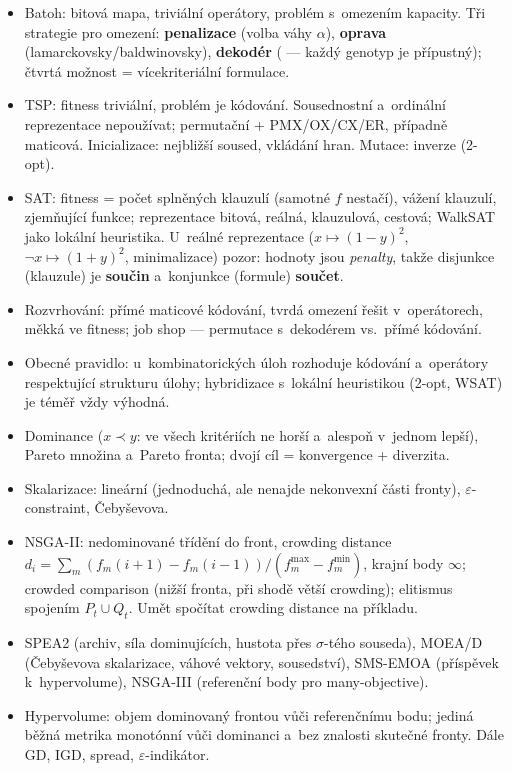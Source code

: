 \documentclass[11pt,a4paper]{article}
\theoremstyle{definition}
\begin{document}
\begin{itemize}
  DeepNEAT a~CoDeepNEAT (moduly + blueprinty); ES pro deep RL.
\item Batoh: bitová mapa, triviální operátory, problém s~omezením kapacity.
  Tři strategie pro omezení: \textbf{penalizace} (volba váhy $\alpha$),
  \textbf{oprava} (lamarckovsky/baldwinovsky), \textbf{dekodér}
  ( --- každý genotyp je přípustný);
  čtvrtá možnost = vícekriteriální formulace.
\item TSP: fitness triviální, problém je kódování. Sousednostní a~ordinální
  reprezentace nepoužívat; permutační + PMX/OX/CX/ER, případně maticová.
  Inicializace: nejbližší soused, vkládání hran. Mutace: inverze (2-opt).
\item SAT: fitness = počet splněných klauzulí (samotné $f$ nestačí),
  vážení klauzulí, zjemňující funkce; reprezentace bitová, reálná,
  klauzulová, cestová; WalkSAT jako lokální heuristika.
  U~reálné reprezentace ($x \mapsto (1-y)^2$, $\neg x \mapsto (1+y)^2$,
  minimalizace) pozor: hodnoty jsou \emph{penalty}, takže disjunkce
  (klauzule) je \textbf{součin} a~konjunkce (formule) \textbf{součet}.
\item Rozvrhování: přímé maticové kódování, tvrdá omezení řešit v~operátorech,
  měkká ve fitness; job shop --- permutace s~dekodérem vs.\ přímé kódování.
\item Obecné pravidlo: u~kombinatorických úloh rozhoduje kódování a~operátory
  respektující strukturu úlohy; hybridizace s~lokální heuristikou (2-opt,
  WSAT) je téměř vždy výhodná.
\item Dominance ($x \prec y$: ve všech kritériích ne horší a~alespoň v~jednom
  lepší), Pareto množina a~Pareto fronta; dvojí cíl = konvergence + diverzita.
\item Skalarizace: lineární (jednoduchá, ale nenajde nekonvexní části fronty),
  $\varepsilon$-constraint, Čebyševova.
\item NSGA-II: nedominované třídění do front, crowding distance
  $d_i = \sum_m (f_m(i+1)-f_m(i-1))/(f_m^{\max}-f_m^{\min})$, krajní body
  $\infty$; crowded comparison (nižší fronta, při shodě větší crowding);
  elitismus spojením $P_t \cup Q_t$. Umět spočítat crowding distance na
  příkladu.
\item SPEA2 (archiv, síla dominujících, hustota přes $\sigma$-tého souseda),
  MOEA/D (Čebyševova skalarizace, váhové vektory, sousedství),
  SMS-EMOA (příspěvek k~hypervolume), NSGA-III (referenční body pro
  many-objective).
\item Hypervolume: objem dominovaný frontou vůči referenčnímu bodu; jediná
  běžná metrika monotónní vůči dominanci a~bez znalosti skutečné fronty.
  Dále GD, IGD, spread, $\varepsilon$-indikátor.
\end{itemize}
\end{document}
